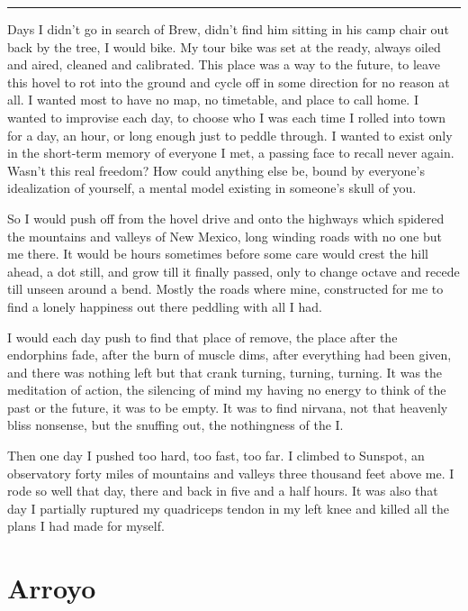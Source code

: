 \documentclass[ebook, 10pt, openright, onecolumn]{memoir}
\newcommand*\starbreak{\fancybreak*{\Large{* * *}}}
\begin{document}
\starbreak

Days I didn't go in search of Brew, didn't find him sitting in his
camp chair out back by the tree, I would bike.  My tour bike was set at the
ready, always oiled and aired, cleaned and calibrated.  This place was a way to
the future, to leave this hovel to rot into the ground and cycle off in some
direction for no reason at all.  I wanted most to have no map, no timetable, and
place to call home.  I wanted to improvise each day, to choose who I was each
time I rolled into town for a day, an hour, or long enough just to peddle
through.  I wanted to exist only in the short-term memory of everyone I met, a
passing face to recall never again.  Wasn't this real freedom?  How could
anything else be, bound by everyone's idealization of yourself, a mental model
existing in someone's skull of you.

So I would push off from the hovel drive and onto the highways which spidered
the mountains and valleys of New Mexico, long winding roads with no one but me
there.  It would be hours sometimes before some care would crest the hill ahead,
a dot still, and grow till it finally passed, only to change octave and recede
till unseen around a bend.  Mostly the roads where mine, constructed for me to
find a lonely happiness out there peddling with all I had.

I would each day push to find that place of remove, the place after the
endorphins fade, after the burn of muscle dims, after everything had been given,
and there was nothing left but that crank turning, turning, turning.  It was the
meditation of action, the silencing of mind my having no energy to think of the
past or the future, it was to be empty.  It was to find nirvana, not that
heavenly bliss nonsense, but the snuffing out, the nothingness of the I.  

Then one day I pushed too hard, too fast, too far.  I climbed to Sunspot, an
observatory forty miles of mountains and valleys three thousand feet above me.
I rode so well that day, there and back in five and a half hours. It was also
that day I partially ruptured my quadriceps tendon in my left knee and killed
all the plans I had made for myself.


\chapter{Arroyo}
\label{cha:arroyo}
\end{document}
